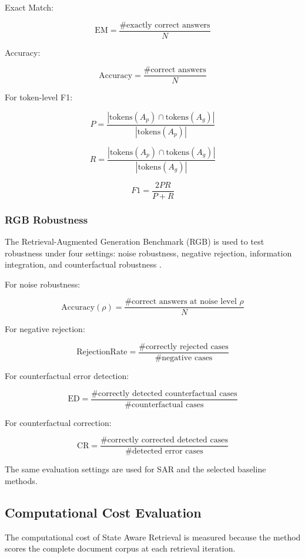 \documentclass[12pt,a4paper]{report}
\begin{document}
Exact Match:

\[
\mathrm{EM}
=
\frac{
\#\text{exactly correct answers}
}
{N}
\]

Accuracy:

\[
\mathrm{Accuracy}
=
\frac{
\#\text{correct answers}
}
{N}
\]

For token-level F1:

\[
P
=
\frac{
|\mathrm{tokens}(A_p)\cap\mathrm{tokens}(A_g)|
}
{|\mathrm{tokens}(A_p)|}
\]

\[
R
=
\frac{
|\mathrm{tokens}(A_p)\cap\mathrm{tokens}(A_g)|
}
{|\mathrm{tokens}(A_g)|}
\]

\[
F1
=
\frac{2PR}{P+R}
\]

\subsubsection{RGB Robustness}

The Retrieval-Augmented Generation Benchmark (RGB) is used to test
robustness under four settings: noise robustness, negative rejection,
information integration, and counterfactual robustness
\cite{chen2024rgb}.

For noise robustness:

\[
\mathrm{Accuracy}(\rho)
=
\frac{
\#\text{correct answers at noise level }\rho
}
{N}
\]

For negative rejection:

\[
\mathrm{RejectionRate}
=
\frac{
\#\text{correctly rejected cases}
}
{
\#\text{negative cases}
}
\]

For counterfactual error detection:

\[
\mathrm{ED}
=
\frac{
\#\text{correctly detected counterfactual cases}
}
{
\#\text{counterfactual cases}
}
\]

For counterfactual correction:

\[
\mathrm{CR}
=
\frac{
\#\text{correctly corrected detected cases}
}
{
\#\text{detected error cases}
}
\]

The same evaluation settings are used for SAR and the selected baseline
methods.

\subsection{Computational Cost Evaluation}

The computational cost of State Aware Retrieval is measured because the
method scores the complete document corpus at each retrieval iteration.
\end{document}
